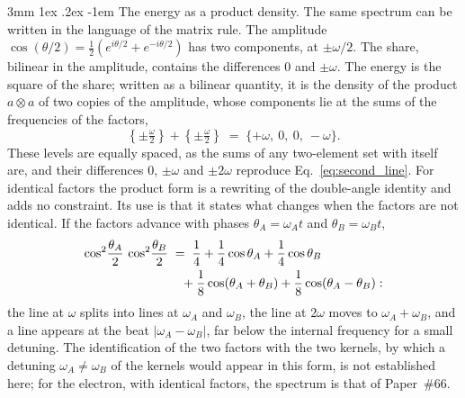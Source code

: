 \documentclass[%
 reprint, amsmath,amssymb, aps, prb, ]{revtex4-2}
\makeatletter
\numberwithin{equation}{section}
\renewcommand\paragraph{%
  \@startsection{paragraph}{4}{\z@}%
    {3mm \@plus 1ex \@minus .2ex}%
    {-1em}%
    {\normalfont\normalsize\itshape}}
\newcommand{\iphase}{\theta}  %
\makeatother
\begin{document}
\paragraph{The energy as a product density.} The same spectrum can be written in the language of the matrix rule. The amplitude $\cos(\iphase/2) = \tfrac12(e^{i\iphase/2} + e^{-i\iphase/2})$ has two components, at $\pm\omega/2$. The share, bilinear in the amplitude, contains the differences $0$ and $\pm\omega$. The energy is the square of the share; written as a bilinear quantity, it is the density of the product $a\otimes a$ of two copies of the amplitude, whose components lie at the sums of the frequencies of the factors,
\begin{equation}
\left\{\pm\tfrac{\omega}{2}\right\} + \left\{\pm\tfrac{\omega}{2}\right\} \;=\; \{+\omega,\ 0,\ 0,\ -\omega\}.
\label{eq:triplet}
\end{equation}
These levels are equally spaced, as the sums of any two-element set with itself are, and their differences $0$, $\pm\omega$ and $\pm2\omega$ reproduce Eq.~\eqref{eq:second_line}. For identical factors the product form is a rewriting of the double-angle identity and adds no constraint. Its use is that it states what changes when the factors are not identical. If the factors advance with phases $\iphase_A = \omega_At$ and $\iphase_B = \omega_Bt$,
\begin{align}
\cos^2\!\frac{\iphase_A}{2}\,\cos^2\!\frac{\iphase_B}{2}
&\;=\; \frac14 + \frac14\cos\iphase_A + \frac14\cos\iphase_B
\notag\\
&\quad + \frac18\cos(\iphase_A + \iphase_B) + \frac18\cos(\iphase_A - \iphase_B):
\label{eq:detuned}
\end{align}
the line at $\omega$ splits into lines at $\omega_A$ and $\omega_B$, the line at $2\omega$ moves to $\omega_A + \omega_B$, and a line appears at the beat $|\omega_A - \omega_B|$, far below the internal frequency for a small detuning. The identification of the two factors with the two kernels, by which a detuning $\omega_A \neq \omega_B$ of the kernels would appear in this form, is not established here; for the electron, with identical factors, the spectrum is that of Paper~\#66.
\end{document}
